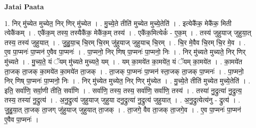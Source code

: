\documentclass[17pt]{extarticle}
\begin{document}
\textbf{Jatai Paata} \newline

1. निर् मु॑च्येत मुच्येत॒ निर् णिर् मु॑च्येत । . मु॒च्ये॒ते तीति॑ मुच्येत मुच्ये॒तेति॑ । . इत्येकै॑क॒ मेकै॑क॒ मिती त्येकै॑कम् । . एकै॑क॒म् तस्य॒ तस्यैकै॑क॒ मेकै॑क॒म् तस्य॑ । . एकै॑क॒मित्येकं᳚ - ए॒क॒म् । . तस्य॑ जुहुयाज् जुहुया॒त् तस्य॒ तस्य॑ जुहुयात् । . जु॒हु॒या॒च् चि॒रम् चि॒रम् जु॑हुयाज् जुहुयाच् चि॒रम् । . चि॒र मे॒वैव चि॒रम् चि॒र मे॒व । . ए॒व पा॒प्मनः॑ पा॒प्मन॑ ए॒वैव पा॒प्मनः॑ । . पा॒प्मनो॒ निर् णिष् पा॒प्मनः॑ पा॒प्मनो॒ निः । . निर् मु॑च्यते मुच्यते॒ निर् णिर् मु॑च्यते । . मु॒च्य॒ते॒ यं ॅयम् मु॑च्यते मुच्यते॒ यम् । . यम् का॒मये॑त का॒मये॑त॒ यं ॅयम् का॒मये॑त । . का॒मये॑त ता॒जक् ता॒जक् का॒मये॑त का॒मये॑त ता॒जक् । . ता॒जक् पा॒प्मनः॑ पा॒प्मन॑ स्ता॒जक् ता॒जक् पा॒प्मनः॑ । . पा॒प्मनो॒ निर् णिष् पा॒प्मनः॑ पा॒प्मनो॒ निः । . निर् मु॑च्येत मुच्येत॒ निर् णिर् मु॑च्येत । . मु॒च्ये॒ते तीति॑ मुच्येत मुच्ये॒तेति॑ । . इति॒ सर्वा॑णि॒ सर्वा॒णी तीति॒ सर्वा॑णि । . सर्वा॑णि॒ तस्य॒ तस्य॒ सर्वा॑णि॒ सर्वा॑णि॒ तस्य॑ । . तस्या॑ नु॒द्रुत्या॑ नु॒द्रुत्य॒ तस्य॒ तस्या॑ नु॒द्रुत्य॑ । . अ॒नु॒द्रुत्य॑ जुहुयाज् जुहुया दनु॒द्रुत्या॑ नु॒द्रुत्य॑ जुहुयात् । . अ॒नु॒द्रुत्येत्य॑नु - द्रुत्य॑ । . जु॒हु॒या॒त् ता॒जक् ता॒जग् जु॑हुयाज् जुहुयात् ता॒जक् । . ता॒जगे॒ वैव ता॒जक् ता॒जगे॒व । . ए॒व पा॒प्मनः॑ पा॒प्मन॑ ए॒वैव पा॒प्मनः॑ । \newline
\end{document}
